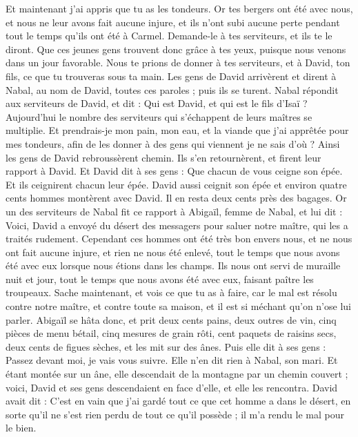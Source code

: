 \begin{multicols}{2}
Et maintenant j'ai appris que tu as les tondeurs. Or tes bergers ont été avec nous, et nous ne leur avons fait aucune injure, et ils n’ont subi aucune perte pendant tout le temps qu'ils ont été à Carmel.
Demande-le à tes serviteurs, et ils te le diront. Que ces jeunes gens trouvent donc grâce à tes yeux, puisque nous venons dans un jour favorable. Nous te prions de donner à tes serviteurs, et à David, ton fils, ce que tu trouveras sous ta main.
Les gens de David arrivèrent et dirent à Nabal, au nom de David, toutes ces paroles ; puis ils se turent.
Nabal répondit aux serviteurs de David, et dit : Qui est David, et qui est le fils d'Isaï ? Aujourd'hui le nombre des serviteurs qui s’échappent de leurs maîtres se multiplie.
Et prendrais-je mon pain, mon eau, et la viande que j'ai apprêtée pour mes tondeurs, afin de les donner à des gens qui viennent je ne sais d'où ?
Ainsi les gens de David rebroussèrent chemin. Ils s'en retournèrent, et firent leur rapport à David.
Et David dit à ses gens : Que chacun de vous ceigne son épée. Et ils ceignirent chacun leur épée. David aussi ceignit son épée et environ quatre cents hommes montèrent avec David. Il en resta deux cents près des bagages.
Or un des serviteurs de Nabal fit ce rapport à Abigaïl, femme de Nabal, et lui dit : Voici, David a envoyé du désert des messagers pour saluer notre maître, qui les a traités rudement.
Cependant ces hommes ont été très bon envers nous, et ne nous ont fait aucune injure, et rien ne nous été enlevé, tout le temps que nous avons été avec eux lorsque nous étions dans les champs.
Ils nous ont servi de muraille nuit et jour, tout le temps que nous avons été avec eux, faisant paître les troupeaux.
Sache maintenant, et vois ce que tu as à faire, car le mal est résolu contre notre maître, et contre toute sa maison, et il est si méchant qu'on n'ose lui parler.
Abigaïl se hâta donc, et prit deux cents pains, deux outres de vin, cinq pièces de menu bétail, cinq mesures de grain rôti, cent paquets de raisins secs, deux cents de figues sèches, et les mit sur des ânes.
Puis elle dit à ses gens : Passez devant moi, je vais vous suivre. Elle n'en dit rien à Nabal, son mari.
Et étant montée sur un âne, elle descendait de la montagne par un chemin couvert ; voici, David et ses gens descendaient en face d’elle, et elle les rencontra.
David avait dit : C'est en vain que j'ai gardé tout ce que cet homme a dans le désert, en sorte qu'il ne s'est rien perdu de tout ce qu’il possède ; il m'a rendu le mal pour le bien.

\end{multicols}
